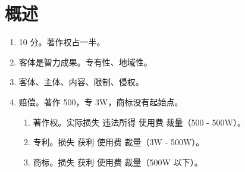 \section{概述}
\begin{enumerate}
  \item 10 分。著作权占一半。
  \item 客体是智力成果。专有性、地域性。
  \item 客体、主体、内容、限制、侵权。
  \item 赔偿。著作 500，专 3W，商标没有起始点。
        \begin{enumerate}
          \item 著作权。实际损失 \hz 违法所得 \yjt 使用费 \yjt 裁量（500 - 500W）。
          \item 专利。损失 \hz 获利 \yjt 使用费 \yjt 裁量（3W - 500W）。
          \item 商标。损失 \hz 获利 \yjt 使用费 \yjt 裁量（500W 以下）。
        \end{enumerate}
\end{enumerate}

